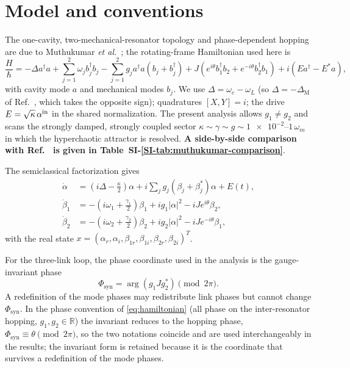 \documentclass[Phys]{SciPost}
\begin{document}
\section{Model and conventions}

The one-cavity, two-mechanical-resonator topology and phase-dependent hopping are due to Muthukumar \emph{et al.}~\cite{muthukumar2025doi}; the rotating-frame Hamiltonian used here is
\begin{equation}\label{eq:hamiltonian}
\frac{H}{\hbar}=-\Delta a^\dagger a
+\sum_{j=1}^{2}\omega_j b_j^\dagger b_j
-\sum_{j=1}^{2}g_j a^\dagger a(b_j+b_j^\dagger)
+J\!\left(e^{i\theta}b_1^\dagger b_2+e^{-i\theta}b_2^\dagger b_1\right)
+i(Ea^\dagger-E^*a),
\end{equation}
with cavity mode $a$ and mechanical modes $b_j$. We use $\Delta=\omega_c-\omega_L$ (so $\Delta=-\Delta_{\mathrm M}$ of Ref.~\cite{muthukumar2025doi}, which takes the opposite sign); quadratures $[X,Y]=i$; the drive $E=\sqrt{\kappa}\,\alpha^{\rm in}$ in the shared normalization. The present analysis allows $g_1\neq g_2$ and scans the strongly damped, strongly coupled sector $\kappa\sim\gamma\sim g\sim\num{1e-2}$--$\num{1}\,\omega_m$ in which the hyperchaotic attractor is resolved. \textbf{A side-by-side comparison with Ref.~\cite{muthukumar2025doi} is given in Table~SI-\ref{SI-tab:muthukumar-comparison}}.

The semiclassical factorization gives
\begin{align}
\dot\alpha &= \left(i\Delta-\frac{\kappa}{2}\right)\alpha
+i\sum_jg_j(\beta_j+\beta_j^*)\alpha+E(t),\\
\dot\beta_1 &= -\left(i\omega_1+\frac{\gamma_1}{2}\right)\beta_1
+ig_1|\alpha|^2-iJe^{i\theta}\beta_2,\\
\dot\beta_2 &= -\left(i\omega_2+\frac{\gamma_2}{2}\right)\beta_2
+ig_2|\alpha|^2-iJe^{-i\theta}\beta_1,
\label{eq:complex-eom}
\end{align}
with the real state $x=(\alpha_r,\alpha_i,\beta_{1r},\beta_{1i},\beta_{2r},\beta_{2i})^T$.

For the three-link loop, the phase coordinate used in the analysis is the gauge-invariant phase
\begin{equation}\label{eq:flux}
\Phi_{\mathrm{syn}}=\arg(g_1Jg_2^*)\pmod{2\pi}.
\end{equation}
A redefinition of the mode phases may redistribute link phases but cannot change $\Phi_{\mathrm{syn}}$. In the phase convention of \cref{eq:hamiltonian} (all phase on the inter-resonator hopping, $g_1,g_2\in\mathbb{R}$) the invariant reduces to the hopping phase, $\Phi_{\mathrm{syn}}\equiv\theta \pmod{2\pi}$, so the two notations coincide and are used interchangeably in the results; the invariant form is retained because it is the coordinate that survives a redefinition of the mode phases.
\end{document}
